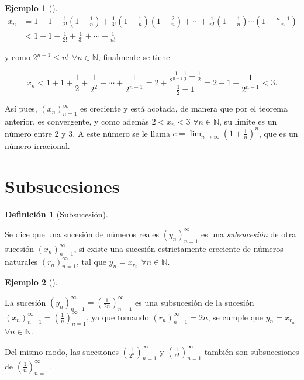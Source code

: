 \documentclass[
  a4paper,
]{scrreport}
\theoremstyle{definition}
\newtheorem{example}{Ejemplo}[chapter]
\theoremstyle{plain}
\theoremstyle{definition}
\newtheorem{definition}{Definición}[chapter]
\theoremstyle{plain}
\theoremstyle{plain}
\theoremstyle{remark}
\begin{document}
\begin{example}[]
\begin{align*}
x_n &= 1 + 1 + \frac{1}{2!}\left(1-\frac{1}{n}\right) + \frac{1}{3!}\left(1-\frac{1}{n}\right)\left(1-\frac{2}{n}\right) + \cdots + \frac{1}{n!}\left(1-\frac{1}{n}\right)\cdots \left(1-\frac{n-1}{n}\right) \\ 
&< 1 + 1 + \frac{1}{2!} + \frac{1}{3!}+\cdots + \frac{1}{n!}
\end{align*}

y como \(2^{n-1}\leq n!\) \(\forall n\in\mathbb{N}\), finalmente se
tiene

\[
x_n<1+1+\frac{1}{2}+\frac{1}{2^2}+\cdots+\frac{1}{2^{n-1}} = 2+ \frac{\frac{1}{2^{n-1}}\frac{1}{2}-\frac{1}{2}}{\frac{1}{2}-1} = 2 +1 -\frac{1}{2^{n-1}} < 3. 
\]

Así pues, \((x_n)_{n=1}^\infty\) es creciente y está acotada, de manera
que por el teorema anterior, es convergente, y como además \(2<x_n<3\)
\(\forall n\in\mathbb{N}\), su límite es un número entre 2 y 3. A este
número se le llama \(e=\lim_{n\to\infty}\left(1+\frac{1}{n}\right)^n\),
que es un número irracional.

\end{example}

\hypertarget{subsucesiones}{%
\section{Subsucesiones}\label{subsucesiones}}

\leavevmode{}%
\begin{definition}[Subsucesión]\label{def-subsucesion}

Se dice que una sucesión de números reales \((y_n)_{n=1}^\infty\) es una
\emph{subsucesión} de otra sucesión \((x_n)_{n=1}^\infty\), si existe
una sucesión estrictamente creciente de números naturales
\((r_n)_{n=1}^\infty\), tal que \(y_n=x_{r_n}\)
\(\forall n\in\mathbb{N}\).

\end{definition}

\leavevmode{}%
\begin{example}[]\label{exm-subsucesion}

La sucesión
\((y_n)_{n=1}^\infty = \left(\frac{1}{2n}\right)_{n=1}^\infty\) es una
subsucesión de la sucesión
\((x_n)_{n=1}^\infty =\left(\frac{1}{n}\right)_{n=1}^\infty\), ya que
tomando \((r_n)_{n=1}^\infty = 2n\), se cumple que \(y_n=x_{r_n}\)
\(\forall n\in\mathbb{N}\).

Del mismo modo, las sucesiones
\(\left(\frac{1}{2^n}\right)_{n=1}^\infty\) y
\(\left(\frac{1}{n!}\right)_{n=1}^\infty\) también son subsucesiones de
\(\left(\frac{1}{n}\right)_{n=1}^\infty\).

\end{example}
\end{document}
